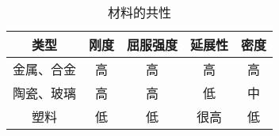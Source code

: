 \begin{table}[ht]
\centering
\caption{材料的共性}\label{tab_SSCUR_2}
\begin{tabular}{|c|c|c|c|c|}
\hline
类型 & 刚度 & 屈服强度 & 延展性 & 密度 \\
\hline
金属、合金 & 高 & 高 & 高 & 高\\
\hline
陶瓷、玻璃 & 高 & 高 & 低 & 中\\
\hline
塑料 & 低 & 低 & 很高 & 低\\
\hline
\end{tabular}
\end{table}
